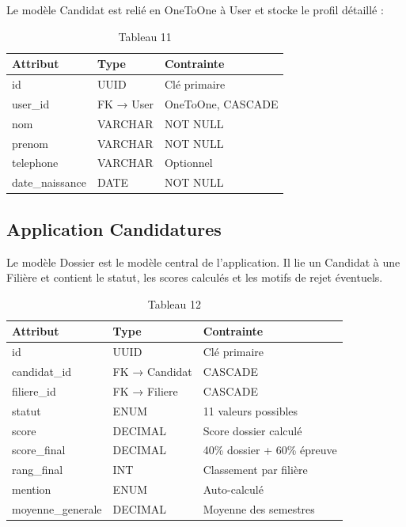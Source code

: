 Le modèle Candidat est relié en OneToOne à User et stocke le profil détaillé :

\begin{table}[htbp]
\centering
\begin{tabular}{|l|l|l|}
\hline
Attribut & Type & Contrainte \\
\hline
id & UUID & Clé primaire \\
\hline
user\_id & FK → User & OneToOne, CASCADE \\
\hline
nom & VARCHAR & NOT NULL \\
\hline
prenom & VARCHAR & NOT NULL \\
\hline
telephone & VARCHAR & Optionnel \\
\hline
date\_naissance & DATE & NOT NULL \\
\hline
\end{tabular}
\caption{Tableau 11}
\label{tab:table_11}
\end{table}

\subsection{Application Candidatures}

Le modèle Dossier est le modèle central de l'application. Il lie un Candidat à une Filière et contient le statut, les scores calculés et les motifs de rejet éventuels.

\begin{table}[htbp]
\centering
\begin{tabular}{|l|l|l|}
\hline
Attribut & Type & Contrainte \\
\hline
id & UUID & Clé primaire \\
\hline
candidat\_id & FK → Candidat & CASCADE \\
\hline
filiere\_id & FK → Filiere & CASCADE \\
\hline
statut & ENUM & 11 valeurs possibles \\
\hline
score & DECIMAL & Score dossier calculé \\
\hline
score\_final & DECIMAL & 40\% dossier + 60\% épreuve \\
\hline
rang\_final & INT & Classement par filière \\
\hline
mention & ENUM & Auto-calculé \\
\hline
moyenne\_generale & DECIMAL & Moyenne des semestres \\
\hline
\end{tabular}
\caption{Tableau 12}
\label{tab:table_12}
\end{table}

